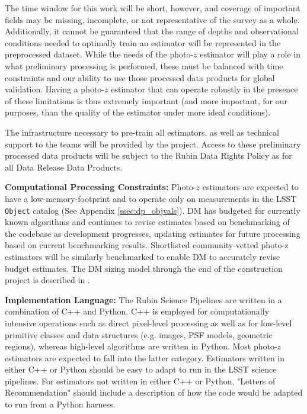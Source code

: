 \documentclass[DM,authoryear,toc]{lsstdoc}
\begin{document}
The time window for this work will be short, however, and coverage of important fields may be missing, incomplete, or not representative of the survey as a whole.
Additionally, it cannot be guaranteed that the range of depths and observational conditions needed to optimally train an estimator will be represented in the preprocessed dataset. 
While the needs of the photo-$z$ estimator will play a role in what preliminary processing is performed, these must be balanced with time constraints and our ability to use those processed data products for global validation.
Having a photo-$z$ estimator that can operate robustly in the presence of these limitations is thus extremely important (and more important, for our purposes, than the quality of the estimator under more ideal conditions).

The infrastructure necessary to pre-train all estimators, as well as technical support to the teams will be provided by the project. 
Access to these preliminary processed data products will be subject to the Rubin Data Rights Policy as for all Data Release Data Products. 
 
\textbf{Computational Processing Constraints:}
Photo-$z$ estimators are expected to have a low-memory-footprint and to operate only on measurements in the LSST {\tt Object} catalog (See Appendix \ref{ssec:dp_objvals}). 
DM has budgeted for currently known algorithms and continues to revise estimates based on benchmarking of the codebase as development progresses, updating estimates for future processing based on current benchmarking results.  
Shortlisted community-vetted photo-z estimators will be similarly benchmarked to enable DM to accurately revise budget estimates. 
The DM sizing model through the end of the construction project is described in \cite{dmtn-135}.

\textbf{Implementation Language:}
The Rubin Science Pipelines are written in a combination of C++ and Python. 
C++ is employed for computationally intensive operations such as direct pixel-level processing as well as for low-level primitive classes and data structures (e.g. images, PSF models, geometric regions), whereas high-level algorithms are written in Python. 
Most photo-$z$ estimators are expected to fall into the latter category.
Estimators written in either C++ or Python should be easy to adapt to run in the LSST science pipelines. 
For estimators not written in either C++ or Python, "Letters of Recommendation" should include a description of how the code would be adapted to run from a Python harness.
\end{document}
